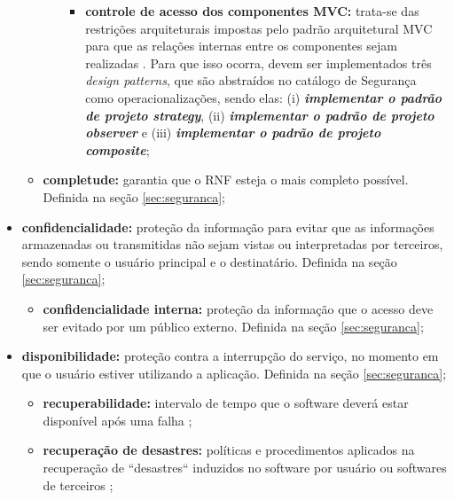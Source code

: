 \begin{itemize}
\begin{itemize}
\begin{itemize}
\begin{itemize}
				\item \textbf{controle de acesso dos componentes MVC:} trata-se das restrições arquiteturais impostas pelo padrão arquitetural MVC para que as relações internas entre os componentes sejam realizadas \cite{buschmann1996system}. Para que isso ocorra, devem ser implementados três \textit{design patterns}, que são abstraídos no catálogo de Segurança como operacionalizações, sendo elas: (i) \textbf{\textit{implementar o padrão de projeto strategy}}, (ii) \textbf{\textit{implementar o padrão de projeto observer}} e (iii) \textbf{\textit{implementar o padrão de projeto composite}};
				
			\end{itemize}
						
		\end{itemize}
		
		\item \textbf{completude:} garantia que o RNF esteja o mais completo possível. Definida na seção \ref{sec:seguranca};
	\end{itemize}
	
	\item \textbf{confidencialidade:} proteção da informação para evitar que as informações armazenadas ou transmitidas não sejam vistas ou interpretadas por terceiros, sendo somente o usuário principal e o destinatário. Definida na seção \ref{sec:seguranca};
	
	\begin{itemize}
		
		\item \textbf{confidencialidade interna:} proteção da informação que o acesso deve ser evitado por um público externo. Definida na seção \ref{sec:seguranca};
		
	\end{itemize}
	 
	 \item \textbf{disponibilidade:} proteção contra a interrupção do serviço, no momento em que o usuário estiver utilizando a aplicação. Definida na seção \ref{sec:seguranca};
	 
	 \begin{itemize}
	 		
	 		\item \textbf{recuperabilidade:} intervalo de tempo que o software deverá estar disponível após uma falha \cite{benitti2015taxonomia};
	 	
	 		\item \textbf{recuperação de desastres:} políticas e procedimentos aplicados na recuperação de ``desastres`` induzidos no software por usuário ou softwares de terceiros \cite{benitti2015taxonomia};
	 		

\end{itemize}
\end{itemize}
